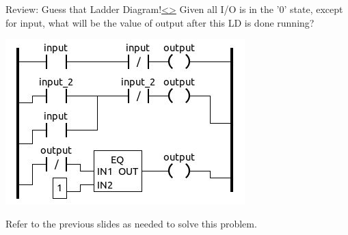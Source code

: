 \documentclass[12pt]{extarticle}
\newenvironment{instructionblock}{\Large\bgroup}{\egroup}
\newcounter{next}
\newcounter{prev}
\begin{document}
\pagebreak
{}
\begin{slide}{Review: Guess that Ladder Diagram!}{\hyperref[slide \theprev]{\textless}\hyperref[slide \thenext]{\textgreater}}
\begin{instructionblock}
	Given all I/O is in the '0' state, except for input, what will be the value of output after this LD is done running?
	\begin{center}
		\includegraphics[scale=1]{figures/LadderDiagram04.JPG}
	\end{center}
\end{instructionblock}
\end{slide}
\vfill
\noindent
Refer to the previous slides as needed to solve this problem.
	
\end{document}
